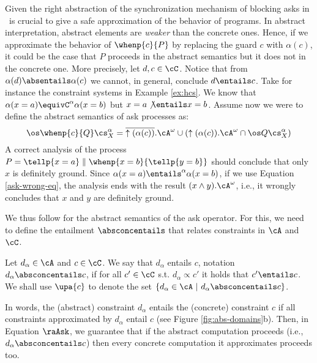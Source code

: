 \documentclass{tlp}
\begin{document}
Given the right abstraction of the synchronization mechanism of blocking asks in \ccp\ is crucial to give a safe approximation of the behavior of programs. In abstract interpretation, abstract elements are \emph{weaker} than the concrete ones. Hence, if we approximate the behavior of $\whenp{c}{P}$ by replacing the guard $c$ with  $\alpha(c)$, it could be the case that $P$ proceeds in the abstract semantics but it does not in the concrete one. More precisely,  let $d,c \in \cC$. Notice that  from  $\alpha(d) \absentails \alpha(c)$ 
we cannot, in general,  conclude $d \entails c$. Take for instance  the constraint systems in Example \ref{ex:hcs}. We know that $\alpha(x=a) \equivC^\alpha \alpha(x=b)$ but $x=a \not\entails x=b$. 
Assume now we were to define the abstract semantics of  ask processes as:
\begin{equation}\label{ask-wrong-eq}
\os \whenp{c}{Q}\cs^\alpha_X =   \overline{\uparrow(\alpha(c))}.\cA^\omega \cup (\uparrow(\alpha(c)).\cA^\omega \cap \os Q\cs^\alpha_X) 
\end{equation}
A correct analysis of the process
 $P=\tellp{x=a} \parallel \whenp{x=b}{\tellp{y=b}}$  
 should conclude that only $x$ is definitely ground. 
 Since $\alpha(x=a) \entails^\alpha \alpha (x=b)$, 
 if  we use   Equation \ref{ask-wrong-eq},  the analysis   ends with the result $(x\wedge y).\cA^\omega$, i.e., it wrongly concludes that $x$ and $y$ are definitely ground. 
  
  We  thus follow 
\cite{ZaffanellaGL97,FalaschiGMP93,Falaschi:97:TCS} for the abstract semantics of the ask operator. 
For this, we need to define the entailment $\absconcentails$ that relates constraints in $\cA$ and $\cC$. 

\begin{definition}\label{def:absconcentails}
Let $d_\alpha\in \cA$ and $c\in \cC$. 
We say that $d_\alpha$ entails $c$, notation $d_\alpha \absconcentails c$, if for all $c'\in \cC$ s.t. $d_\alpha \propto c'$ it holds that $c' \entails c$.  We shall use $\upa{c}$ to denote the set $\{d_\alpha \in \cA \ | \ d_\alpha \absconcentails c\}$.
\end{definition}



In words, the (abstract) constraint $d_\alpha$ 
entails the (concrete) constraint $c$ if all constraints 
approximated by $d_\alpha$ entail $c$ (see Figure \ref{fig:abs-domains}b).  Then, in Equation $\raAsk$, 
we guarantee that if  the abstract computation proceeds
(i.e., $d_\alpha \absconcentails c$) then every concrete computation 
it approximates proceeds too. 
\end{document}
